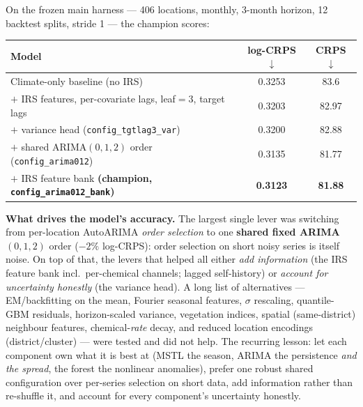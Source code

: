 \documentclass[11pt]{article}
\newcommand{\code}[1]{\texttt{\small #1}}
\begin{document}
On the frozen main harness --- 406 locations, monthly, 3-month horizon, 12 backtest splits,
stride 1 --- the champion scores:
\begin{center}
\small
\begin{tabular}{@{}lcc@{}}
\toprule
Model & log-CRPS $\downarrow$ & CRPS $\downarrow$ \\
\midrule
Climate-only baseline (no IRS) & 0.3253 & 83.6 \\
$+$ IRS features, per-covariate lags, leaf$=3$, target lags & 0.3203 & 82.97 \\
$+$ variance head (\code{config\_tgtlag3\_var}) & 0.3200 & 82.88 \\
$+$ shared ARIMA$(0,1,2)$ order (\code{config\_arima012}) & 0.3135 & 81.77 \\
$+$ IRS feature bank \;\textbf{(champion, \code{config\_arima012\_bank})} & \textbf{0.3123} & \textbf{81.88} \\
\bottomrule
\end{tabular}
\end{center}

\noindent\textbf{What drives the model's accuracy.} The largest single lever was switching
from per-location AutoARIMA \emph{order selection} to one \textbf{shared fixed ARIMA$(0,1,2)$}
order ($-2\%$ log-CRPS): order selection on short noisy series is itself noise. On top of that,
the levers that helped all either \emph{add information} (the IRS feature bank incl.\ per-chemical
channels; lagged self-history) or \emph{account for uncertainty honestly} (the variance head).
A long list of alternatives --- EM/backfitting on the mean, Fourier seasonal features, $\sigma$
rescaling, quantile-GBM residuals, horizon-scaled variance, vegetation indices, spatial
(same-district) neighbour features, chemical-\emph{rate} decay, and reduced location encodings
(district/cluster) --- were tested and did not help. The recurring lesson: let each component
own what it is best at (MSTL the season, ARIMA the persistence \emph{and the spread}, the forest
the nonlinear anomalies), prefer one robust shared configuration over per-series selection on
short data, add information rather than re-shuffle it, and account for every component's
uncertainty honestly.
\end{document}
